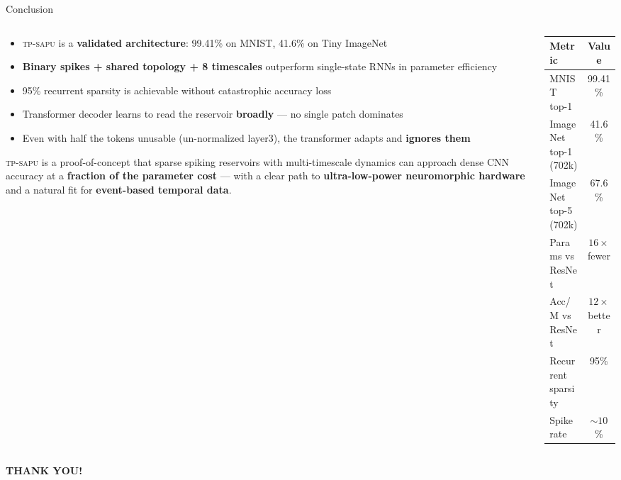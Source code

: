 \documentclass[aspectratio=169,11pt]{beamer}
\newcommand{\hl}[1]{{\color{highlight}\textbf{#1}}}
\newcommand{\tpsapu}{\textsc{tp-sapu}}
\begin{document}
\begin{frame}{Conclusion}
\begin{columns}[T]
\begin{column}{0.58\textwidth}
  \begin{tcolorbox}[mybox,title=What we showed]
    \begin{itemize}
      \item \tpsapu{} is a \textbf{validated architecture}: 99.41\% on MNIST, 41.6\% on Tiny ImageNet
      \item \hl{Binary spikes + shared topology + 8 timescales} outperform single-state RNNs in parameter efficiency
      \item 95\% recurrent sparsity is achievable without catastrophic accuracy loss
      \item Transformer decoder learns to read the reservoir \textbf{broadly} — no single patch dominates
      \item Even with half the tokens unusable (un-normalized layer3), the transformer adapts and \textbf{ignores them}
    \end{itemize}
  \end{tcolorbox}
  \vspace{0.4em}
  \begin{tcolorbox}[mybox,title=The bottom line]
    \tpsapu{} is a proof-of-concept that sparse spiking reservoirs
    with multi-timescale dynamics can approach dense CNN accuracy
    at a \hl{fraction of the parameter cost} —
    with a clear path to \hl{ultra-low-power neuromorphic hardware}
    and a natural fit for \hl{event-based temporal data}.
  \end{tcolorbox}
\end{column}
\begin{column}{0.38\textwidth}
  \renewcommand{\arraystretch}{1.4}
  {\small
  \begin{tabular}{lc}
    \toprule
    \textbf{Metric} & \textbf{Value} \\
    \midrule
    MNIST top-1 & 99.41\% \\
    ImageNet top-1 (702k) & 41.6\% \\
    ImageNet top-5 (702k) & 67.6\% \\
    Params vs ResNet & $16\times$ fewer \\
    Acc/M vs ResNet & $12\times$ better \\
    Recurrent sparsity & 95\% \\
    Spike rate & ${\sim}10$\% \\
    \bottomrule
  \end{tabular}}
\end{column}
\end{columns}
\end{frame}

\begin{frame}[plain]
\centering
\vfill

{\Huge\bfseries THANK YOU!}

\vfill
\end{frame}
\end{document}
